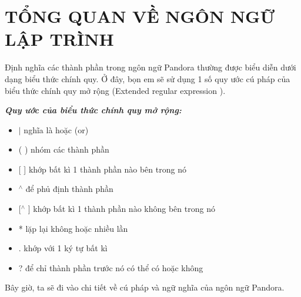 \chapter{\bf{TỔNG QUAN VỀ NGÔN NGỮ LẬP TRÌNH}}

Định nghĩa các thành phần trong ngôn ngữ Pandora thường được biểu diễn dưới dạng biểu thức chính quy\cite{li2008regular}. Ở đây, bọn em sẽ sử dụng 1 số quy ước cú pháp của biểu thức chính quy mở rộng (Extended regular expression \cite{freydenberger2013extended}).

\textbf{\textit{Quy ước của biểu thức chính quy mở rộng:}}

\begin{itemize}
    \item{$|$ nghĩa là hoặc (or)}
    \item{( ) nhóm các thành phần}
    \item{[ ] khớp bất kì 1 thành phần nào bên trong nó}
    \item{$^\wedge$ để phủ định thành phần}
    \item{[$^\wedge$ ] khớp bất kì 1 thành phần nào không bên trong nó}
    \item{* lặp lại không hoặc nhiều lần}
    \item{. khớp với 1 ký tự bất kì}
    \item{? để chỉ thành phần trước nó có thể có hoặc không}
\end{itemize}

Bây giờ, ta sẽ đi vào chi tiết về cú pháp và ngữ nghĩa của ngôn ngữ Pandora.




